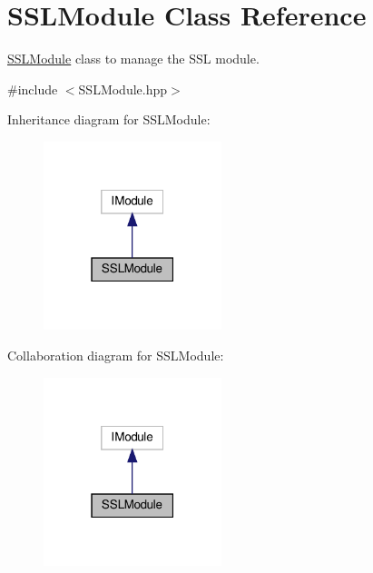 \hypertarget{class_s_s_l_module}{}\section{S\+S\+L\+Module Class Reference}
\label{class_s_s_l_module}


\hyperlink{class_s_s_l_module}{S\+S\+L\+Module} class to manage the S\+SL module.  




{\ttfamily \#include $<$S\+S\+L\+Module.\+hpp$>$}



Inheritance diagram for S\+S\+L\+Module\+:\nopagebreak
\begin{figure}[H]
\begin{center}
\leavevmode
\includegraphics[width=147pt]{class_s_s_l_module__inherit__graph}
\end{center}
\end{figure}


Collaboration diagram for S\+S\+L\+Module\+:\nopagebreak
\begin{figure}[H]
\begin{center}
\leavevmode
\includegraphics[width=147pt]{class_s_s_l_module__coll__graph}
\end{center}
\end{figure}
